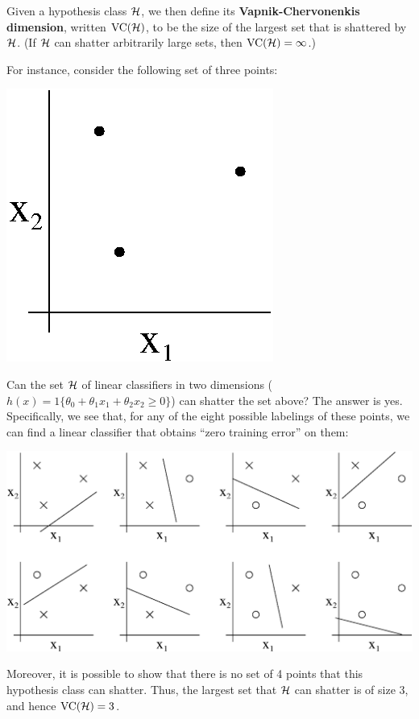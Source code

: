 \documentclass{article} %
\begin{document}
Given a hypothesis class ${\cal H}$, we then define its {\bf Vapnik-Chervonenkis dimension},
  written ${\rm VC}({\cal H})$, to be the
size of the largest set that is shattered by ${\cal H}$.  (If ${\cal H}$ can shatter arbitrarily large sets, then
${\rm VC}({\cal H}) = \infty$.)

For instance, consider the following set of three points:

\begin{center}
\includegraphics[scale=0.5]{shatter3.eps}
\end{center}

Can the set ${\cal H}$ of linear classifiers in two
dimensions ($h(x) = 1\{\theta_0 + \theta_1 x_1 + \theta_2 x_2\geq 0 \}$) can shatter
the set above?  The answer is yes.  Specifically, we see that, for any of the eight possible
labelings of these points, we can find a linear classifier that obtains ``zero training error''
on them:
\begin{center}
\includegraphics[scale=0.5]{shatter3-8.eps}
\end{center}
Moreover, it is possible to show that there is no set of 4 points that this
hypothesis class can shatter.  Thus, the largest set that ${\cal H}$ can shatter
is of size 3, and hence ${\rm VC}({\cal H})=3$.
\end{document}
